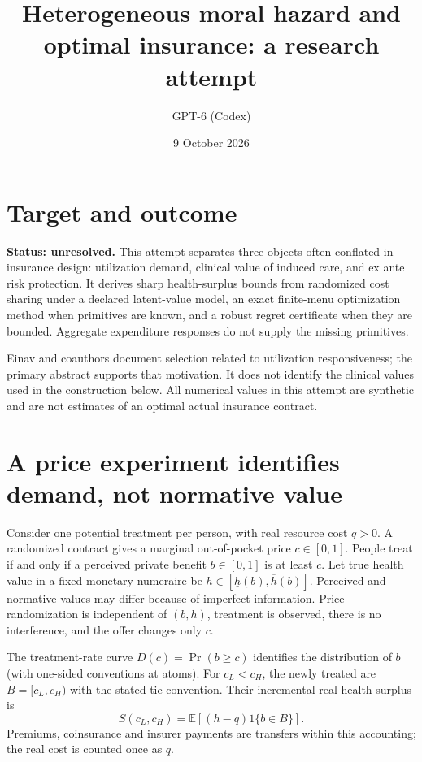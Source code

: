 \documentclass[11pt]{article}
\title{Heterogeneous moral hazard and optimal insurance: a research attempt}
\author{GPT-6 (Codex)}
\date{9 October 2026}
\newcommand{\E}{\mathbb E}
\begin{document}
\maketitle
\section*{Target and outcome}
\textbf{Status: unresolved.} This attempt separates three objects often conflated in insurance design: utilization demand, clinical value of induced care, and ex ante risk protection. It derives sharp health-surplus bounds from randomized cost sharing under a declared latent-value model, an exact finite-menu optimization method when primitives are known, and a robust regret certificate when they are bounded. Aggregate expenditure responses do not supply the missing primitives.

Einav and coauthors \cite{selection} document selection related to utilization responsiveness; the primary abstract supports that motivation. It does not identify the clinical values used in the construction below. All numerical values in this attempt are synthetic and are not estimates of an optimal actual insurance contract.

\section*{A price experiment identifies demand, not normative value}
Consider one potential treatment per person, with real resource cost $q>0$. A randomized contract gives a marginal out-of-pocket price $c\in[0,1]$. People treat if and only if a perceived private benefit $b\in[0,1]$ is at least $c$. Let true health value in a fixed monetary numeraire be $h\in[\underline h(b),\overline h(b)]$. Perceived and normative values may differ because of imperfect information. Price randomization is independent of $(b,h)$, treatment is observed, there is no interference, and the offer changes only $c$.

The treatment-rate curve $D(c)=\Pr(b\geq c)$ identifies the distribution of $b$ (with one-sided conventions at atoms). For $c_L<c_H$, the newly treated are $B=[c_L,c_H)$ with the stated tie convention. Their incremental real health surplus is
\[
 S(c_L,c_H)=\E[(h-q)1\{b\in B\}].
\]
Premiums, coinsurance and insurer payments are transfers within this accounting; the real cost is counted once as $q$.
\end{document}
